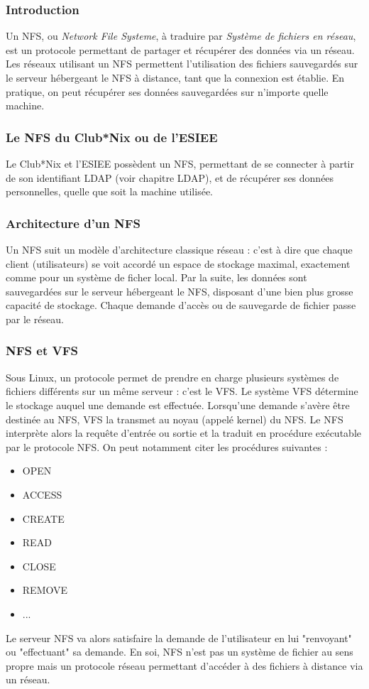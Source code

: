 \subsubsection{Introduction}

Un NFS, ou \textit{Network File Systeme}, à traduire par \textit{Système de
fichiers en réseau}, est un protocole permettant de partager et récupérer des
données via un réseau. Les réseaux utilisant un NFS permettent l'utilisation des
fichiers sauvegardés sur le serveur hébergeant le NFS à distance, tant que la
connexion est établie. En pratique, on peut récupérer ses données sauvegardées
sur n'importe quelle machine.


\subsubsection{Le NFS du Club*Nix ou de l'ESIEE}

Le Club*Nix et l'ESIEE possèdent un NFS, permettant de se connecter à partir de son identifiant LDAP (voir chapitre LDAP),
 et de récupérer ses données personnelles, quelle que soit la machine utilisée.
\subsubsection{Architecture d'un NFS}
Un NFS suit un modèle d'architecture classique réseau : c'est à dire que chaque client (utilisateurs) se voit accordé
 un espace de stockage maximal, exactement comme pour un système de ficher local. Par la suite, les données sont sauvegardées
 sur le serveur hébergeant le NFS, disposant d'une bien plus grosse capacité de stockage. Chaque demande d'accès
  ou de sauvegarde de fichier passe par le réseau.


\subsubsection{NFS et VFS}
Sous Linux, un protocole permet de prendre en charge plusieurs systèmes de fichiers différents sur un même serveur :
c'est le VFS. Le système VFS détermine le stockage auquel une demande est effectuée.
Lorsqu'une demande s'avère être destinée au NFS, VFS la transmet au noyau (appelé kernel) du NFS. Le NFS interprète
alors la requête d'entrée ou sortie et la traduit en procédure exécutable par le protocole NFS.
On peut notamment citer les procédures suivantes :
\begin{itemize}
  \item OPEN
  \item ACCESS
  \item CREATE
  \item READ
  \item CLOSE
  \item REMOVE
  \item ...
\end{itemize}
Le serveur NFS va alors satisfaire la demande de l'utilisateur en lui "renvoyant" ou "effectuant" sa demande.
En soi, NFS n'est pas un système de fichier au sens propre mais un protocole réseau permettant d'accéder à des fichiers
à distance via un réseau.


